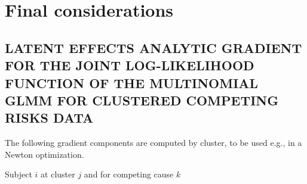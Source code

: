 \documentclass[12pt, %
               openright, %
               oneside, %
               a4paper, %
               chapter=TITLE, %
               section=TITLE, %
               brazil,
               english %
]{abntex2}
\renewcommand{\ABNTEXchapterfontsize}{\bfseries\large}
\begin{document}
\chapter{Final considerations}
\label{cap:finalc}

\setlength{\afterchapskip}{\baselineskip}

\postextual
\begin{apendicesenv}
\partapendices
{}
\renewcommand{\ABNTEXchapterfontsize}{\ABNTEXsectionfont}

\chapter{LATENT EFFECTS ANALYTIC GRADIENT FOR THE JOINT
  LOG-LIKELIHOOD FUNCTION OF THE MULTINOMIAL GLMM FOR
  CLUSTERED COMPETING RISKS DATA}
\label{cap:appendixA}

The following gradient components are computed by cluster,
to be used e.g., in a Newton optimization.

Subject \(i\) at cluster \(j\) and for competing cause \(k\)


\end{apendicesenv}
\end{document}
